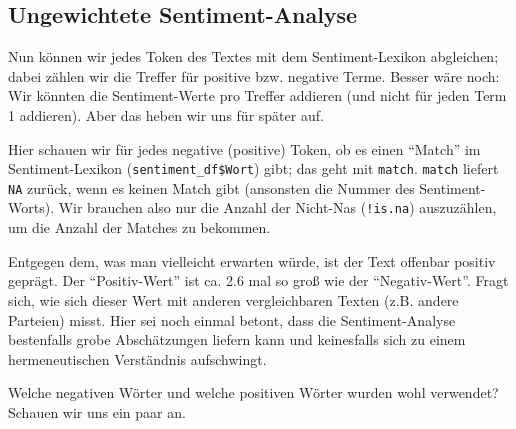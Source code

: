 \documentclass[12pt,]{book}
\makeatletter
\newenvironment{Shaded}{\begin{snugshade}}{\end{snugshade}}
\newcommand{\KeywordTok}[1]{\textcolor[rgb]{0.13,0.29,0.53}{\textbf{{#1}}}}
\newcommand{\DecValTok}[1]{\textcolor[rgb]{0.00,0.00,0.81}{{#1}}}
\newcommand{\StringTok}[1]{\textcolor[rgb]{0.31,0.60,0.02}{{#1}}}
\newcommand{\CommentTok}[1]{\textcolor[rgb]{0.56,0.35,0.01}{\textit{{#1}}}}
\newcommand{\NormalTok}[1]{{#1}}
\newenvironment{kframe}{%
\medskip{}
\setlength{\fboxsep}{.8em}
 \def\at@end@of@kframe{}%
 \ifinner\ifhmode%
  \def\at@end@of@kframe{\end{minipage}}%
  \begin{minipage}{\columnwidth}%
 \fi\fi%
 \def\FrameCommand##1{\hskip\@totalleftmargin \hskip-\fboxsep
 \colorbox{shadecolor}{##1}\hskip-\fboxsep
     \hskip-\linewidth \hskip-\@totalleftmargin \hskip\columnwidth}%
 \MakeFramed {\advance\hsize-\width
   \@totalleftmargin\z@ \linewidth\hsize
   \@setminipage}}%
 {\par\unskip\endMakeFramed%
 \at@end@of@kframe}
\renewenvironment{Shaded}{\begin{kframe}}{\end{kframe}}
\makeatother
\begin{document}
\subsection{Ungewichtete
Sentiment-Analyse}\label{ungewichtete-sentiment-analyse}

Nun können wir jedes Token des Textes mit dem Sentiment-Lexikon
abgleichen; dabei zählen wir die Treffer für positive bzw. negative
Terme. Besser wäre noch: Wir könnten die Sentiment-Werte pro Treffer
addieren (und nicht für jeden Term 1 addieren). Aber das heben wir uns
für später auf.

\begin{Shaded}
\end{Shaded}

Hier schauen wir für jedes negative (positive) Token, ob es einen
``Match'' im Sentiment-Lexikon (\texttt{sentiment\_df\$Wort}) gibt; das
geht mit \texttt{match}. \texttt{match} liefert \texttt{NA} zurück, wenn
es keinen Match gibt (ansonsten die Nummer des Sentiment-Worts). Wir
brauchen also nur die Anzahl der Nicht-Nas (\texttt{!is.na})
auszuzählen, um die Anzahl der Matches zu bekommen.

Entgegen dem, was man vielleicht erwarten würde, ist der Text offenbar
positiv geprägt. Der ``Positiv-Wert'' ist ca. 2.6 mal so groß wie der
``Negativ-Wert''. Fragt sich, wie sich dieser Wert mit anderen
vergleichbaren Texten (z.B. andere Parteien) misst. Hier sei noch einmal
betont, dass die Sentiment-Analyse bestenfalls grobe Abschätzungen
liefern kann und keinesfalls sich zu einem hermeneutischen Verständnis
aufschwingt.

Welche negativen Wörter und welche positiven Wörter wurden wohl
verwendet? Schauen wir uns ein paar an.
\end{document}
